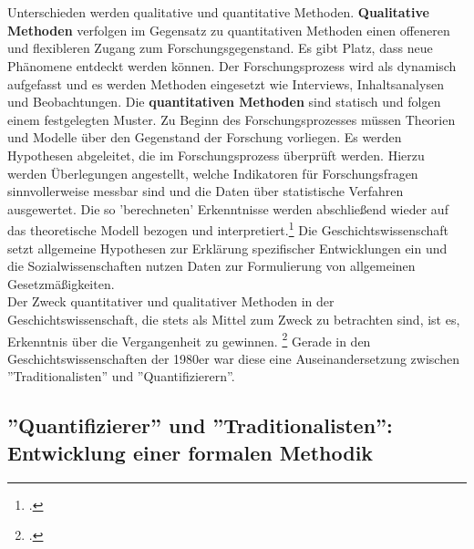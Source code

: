 \documentclass[12pt,a4paper]{article}
\begin{document}
\\
\\
Unterschieden werden qualitative und quantitative Methoden. \textbf{Qualitative Methoden} verfolgen im Gegensatz zu quantitativen Methoden einen offeneren und flexibleren Zugang zum Forschungsgegenstand. Es gibt Platz, dass neue Phänomene entdeckt werden können. Der Forschungsprozess wird als dynamisch aufgefasst und es werden Methoden eingesetzt wie Interviews, Inhaltsanalysen und Beobachtungen. Die \textbf{quantitativen Methoden} sind statisch und folgen einem festgelegten Muster. Zu Beginn des Forschungsprozesses müssen Theorien und Modelle über den Gegenstand der Forschung vorliegen. Es werden Hypothesen abgeleitet, die im Forschungsprozess überprüft werden. Hierzu werden Überlegungen angestellt, welche Indikatoren für Forschungsfragen sinnvollerweise messbar sind und die Daten über statistische Verfahren ausgewertet. Die so 'berechneten' Erkenntnisse werden abschließend wieder auf das theoretische Modell bezogen und interpretiert.\footcite[][S.309–329]{wolf1995qualitative} Die Geschichtswissenschaft setzt allgemeine Hypothesen zur Erklärung spezifischer Entwicklungen ein und die Sozialwissenschaften nutzen Daten zur Formulierung von allgemeinen Gesetzmäßigkeiten.
\\
Der Zweck quantitativer und qualitativer Methoden in der Geschichtswissenschaft, die stets als Mittel zum Zweck zu betrachten sind, ist es, Erkenntnis über die Vergangenheit zu gewinnen. \footcite[][S.203-206]{jarausch1985quantitative} Gerade in den Geschichtswissenschaften der 1980er war diese eine Auseinandersetzung zwischen ''Traditionalisten'' und ''Quantifizierern''.

\newpage
\subsection{''Quantifizierer'' und ''Traditionalisten'': Entwicklung einer formalen Methodik }
\end{document}
